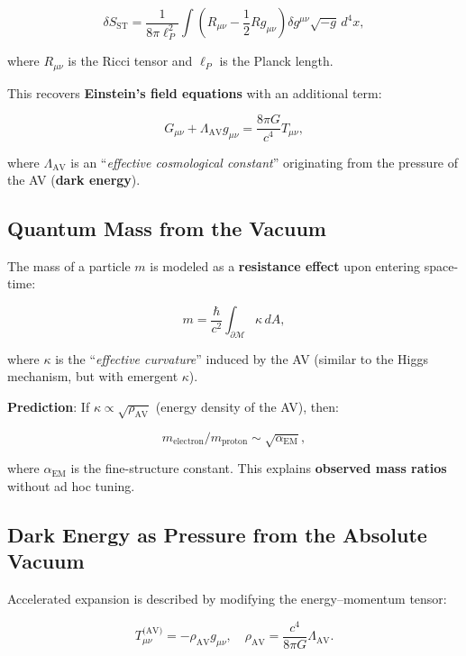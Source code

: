 \documentclass[a4paper]{article}
\theoremstyle{definition}
\theoremstyle{remark}
\numberwithin{equation}{section}
\begin{document}
\begin{equation}
	\delta S_{\text{ST}} = \frac{1}{8\pi \ell_P^2} \int \left( R_{\mu\nu} - \frac{1}{2} R g_{\mu\nu} \right) \delta g^{\mu\nu} \sqrt{-g} \, d^4 x,
\end{equation}

where \( R_{\mu\nu} \) is the Ricci tensor and \( \ell_P \) is the Planck length.

This recovers \textbf{Einstein’s field equations} with an additional term:

\[
G_{\mu\nu} + \Lambda_{\text{AV}} g_{\mu\nu} = \frac{8\pi G}{c^4} T_{\mu\nu},
\]

where \( \Lambda_{\text{AV}} \) is an ``\textit{effective cosmological constant}'' originating from the pressure of the AV (\textbf{dark energy}).

\subsection{Quantum Mass from the Vacuum}

The mass of a particle \( m \) is modeled as a \textbf{resistance effect} upon entering space-time:

\begin{equation}
	m = \frac{\hbar}{c^2} \int_{\partial \mathcal{M}} \kappa \, dA,
\end{equation}

where \( \kappa \) is the ``\textit{effective curvature}'' induced by the AV (similar to the Higgs mechanism, but with emergent \( \kappa \)).

\textbf{Prediction}: If \( \kappa \propto \sqrt{\rho_{\text{AV}}} \) (energy density of the AV), then:

\begin{equation}
	m_{\text{electron}} / m_{\text{proton}} \sim \sqrt{\alpha_{\text{EM}}},
\end{equation}

where \( \alpha_{\text{EM}} \) is the fine-structure constant. This explains \textbf{observed mass ratios} without ad hoc tuning.

	
\subsection{Dark Energy as Pressure from the Absolute Vacuum}

Accelerated expansion is described by modifying the energy–momentum tensor:

\begin{equation}
	T_{\mu\nu}^{\text{(AV)}} = - \rho_{\text{AV}} g_{\mu\nu}, \quad \rho_{\text{AV}} = \frac{c^4}{8\pi G} \Lambda_{\text{AV}}.
\end{equation}
\end{document}
